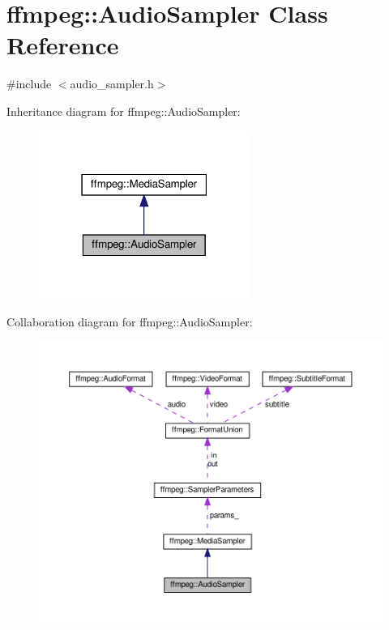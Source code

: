 \hypertarget{classffmpeg_1_1AudioSampler}{}\section{ffmpeg\+:\+:Audio\+Sampler Class Reference}
\label{classffmpeg_1_1AudioSampler}


{\ttfamily \#include $<$audio\+\_\+sampler.\+h$>$}



Inheritance diagram for ffmpeg\+:\+:Audio\+Sampler\+:
\nopagebreak
\begin{figure}[H]
\begin{center}
\leavevmode
\includegraphics[width=195pt]{classffmpeg_1_1AudioSampler__inherit__graph}
\end{center}
\end{figure}


Collaboration diagram for ffmpeg\+:\+:Audio\+Sampler\+:
\nopagebreak
\begin{figure}[H]
\begin{center}
\leavevmode
\includegraphics[width=350pt]{classffmpeg_1_1AudioSampler__coll__graph}
\end{center}
\end{figure}
